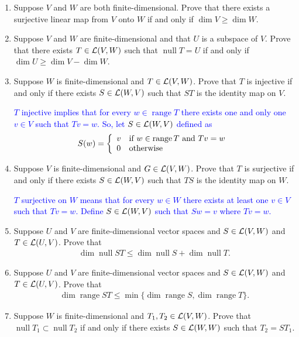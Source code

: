 \documentclass[10pt,a4paper]{report}
\DeclareMathOperator{\RANGE}{range}
\DeclareMathOperator{\NULL}{null}
\newcommand{\BLUE}[1]{\textcolor{blue}{#1}}
\begin{document}
\begin{enumerate}
\item Suppose $V$ and $W$ are both finite-dimensional.  Prove that there exists a surjective linear map from $V$ onto $W$ if and only if $\dim V \ge \dim W$.

\item Suppose $V$ and $W$ are finite-dimensional and that $U$ is a subspace of $V$.  Prove that there exists $T \in \mathcal{L}(V,W)$ such that $\NULL T = U$ if and only if $\dim U \ge \dim V - \dim W$.

\item Suppose $W$ is finite-dimensional and $T \in \mathcal{L}(V,W)$.  Prove  that $T$ is injective if and only if there exists $S\in \mathcal{L}(W,V)$ such that $ST$ is the identity map on $V$.

\BLUE{$T$ injective implies that for every $w \in \RANGE T$ there exists one and only one $v \in V$ such that $Tv=w$.  So, let $S \in \mathcal{L}(W,V)$ defined as
\begin{align*}
	S(w) = \BINDEF{v & \text{if } w \in \RANGE T \AND Tv=w}{0 & \text{otherwise}}
\end{align*}
}

\item Suppose $V$ is finite-dimensional and $G\in \mathcal{L}(V,W)$.  Prove that $T$ is surjective if and only if there exists $S \in \mathcal{L}(W,V)$ such that $TS$ is the identity map on $W$.

\BLUE{$T$ surjective on $W$ means that for every $w \in W$ there exists at least one $v \in V$ such that $Tv=w$.  Define $S \in \mathcal{L}(W,V)$ such that $Sw = v$ where $Tv=w$.
}

\item Suppose $U$ and $V$ are finite-dimensional vector spaces and $S\in\mathcal{L}(V,W)$ and $T\in\mathcal{L}(U,V)$.  Prove that 
\begin{align*}
	\dim\NULL ST \le \dim \NULL S + \dim \NULL T.
\end{align*}

\item Suppose $U$ and $V$ are finite-dimensional vector spaces and $S \in \mathcal{L}(V,W)$ and $T \in \mathcal{L}(U,V)$.  Prove that
\begin{align*}
	\dim \RANGE ST \le \min\{\dim\RANGE S, \dim \RANGE T\}.
\end{align*}

\item Suppose $W$ is finite-dimensional and $T_1,T_2 \in \mathcal{L}(V,W)$.  Prove that $\NULL T_1\subset \NULL T_2$ if and only if there exists $S \in \mathcal{L}(W,W)$ such that $T_2 = ST_1$.


\end{enumerate}
\end{document}
